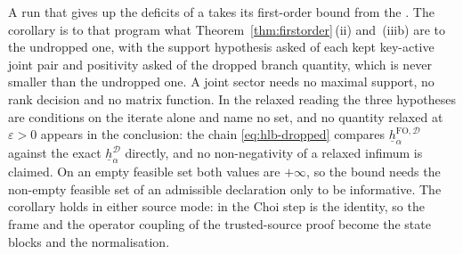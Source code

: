 
A run that gives up the deficits of a  takes its
first-order bound from the . The corollary is to that
program what Theorem~\ref{thm:firstorder}\,(ii) and~(iiib) are to the
undropped one, with the support hypothesis asked of each kept key-active
joint pair and positivity asked of the dropped branch quantity, which is
never smaller than the undropped one. A  joint sector
needs no maximal support, no rank decision and no matrix function. In the
relaxed reading the three hypotheses are conditions on the iterate alone
and name no set, and no quantity relaxed at $\varepsilon>0$ appears in the
conclusion: the chain
\eqref{eq:hlb-dropped} compares
$\underline{h}^{\mathrm{FO},\mathcal{D}}_{\alpha}$ against the exact
$\underline{h}^{\mathcal{D}}_{\alpha}$ directly, and no non-negativity of
a relaxed infimum is claimed. On an empty feasible set both values are
$+\infty$, so the bound needs the non-empty feasible set of an admissible
declaration only to be informative. The corollary holds in either source
mode: in  the Choi step is the identity, so the
frame and the operator coupling of the trusted-source proof become the
state blocks and the normalisation.

